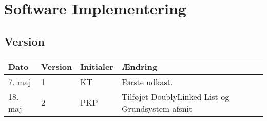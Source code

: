 \chapter{Software Implementering} \label{ch:SwImpl}
\section*{Version}
\begin{table}[h]
	\centering
	\begin{tabularx}{\textwidth - 2cm}{|l|l|l|X|}
	\hline
	Dato	& Version	& Initialer & Ændring	\\ \hline
	7. maj & 1 & KT & Første udkast. \\ \hline 
	18. maj & 2 & PKP & Tilføjet DoublyLinked List og Grundsystem afsnit\\ \hline 
	\end{tabularx}
\end{table}

\clearpage











